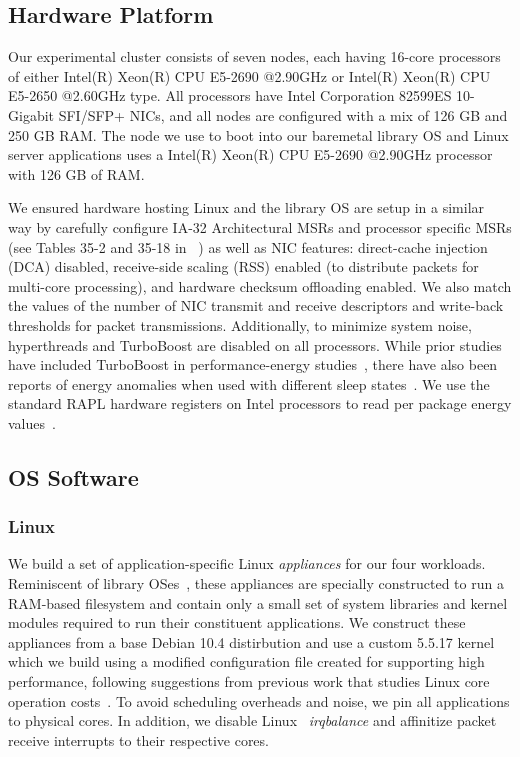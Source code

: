 \subsection{Hardware Platform}
Our experimental cluster consists of seven nodes,
each having 16-core processors of either 
Intel(R) Xeon(R) CPU E5-2690 @2.90GHz
or Intel(R) Xeon(R) CPU E5-2650 @2.60GHz type.
All processors have Intel Corporation 82599ES 10-Gigabit SFI/SFP+ NICs,
and all nodes are configured with a mix of 126 GB and 250 GB RAM.
The node we use to boot into our baremetal library OS and Linux server applications uses a Intel(R) Xeon(R) CPU E5-2690 @2.90GHz processor with 126 GB of RAM.

We ensured hardware hosting Linux and the library OS
are setup in a similar way by carefully configure IA-32 Architectural MSRs and processor specific MSRs
(see Tables 35-2 and 35-18 in ~\cite{intel_msr})
as well as NIC features:
direct-cache injection (DCA) disabled,
receive-side scaling (RSS) enabled
(to distribute packets for multi-core processing),
and hardware checksum offloading enabled.
We also match the values of
the number of NIC transmit and receive descriptors
and write-back thresholds for packet transmissions.
Additionally, to minimize system noise, hyperthreads and TurboBoost are disabled on all processors. While prior studies have included TurboBoost in performance-energy studies~\cite{udpm, pacingtoidle, PerAppPower, ixcp}, there have also been reports of energy anomalies when used with different sleep states~\cite{slowdownorsleep}. We use the standard RAPL hardware registers on Intel processors to read per package energy values~\cite{intel_rapl, rapl}.

\subsection{OS Software}
\label{sec:OS}

\subsubsection{Linux}
\label{sec:OS_linux}
We build a set of application-specific Linux \textit{appliances} for our four workloads. Reminiscent of library OSes~\cite{unikernels}, these appliances are specially constructed to run a RAM-based filesystem and contain only a small set of system libraries and kernel modules required to run their constituent applications. We construct these appliances from a base Debian 10.4 distirbution and use a custom 5.5.17 kernel which we build using a modified configuration file created for supporting high performance, following suggestions from previous work that studies Linux core operation costs~\cite{linux-core-ops}. To avoid scheduling overheads and noise, we pin all applications to physical cores. In addition, we disable Linux ~\textit{irqbalance} and affinitize packet receive interrupts to their respective cores.

